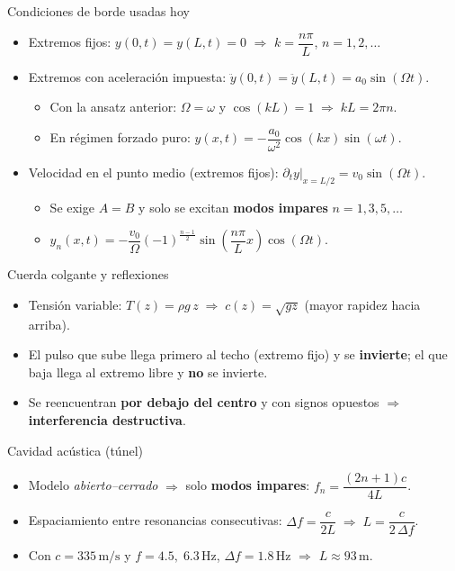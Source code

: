 \documentclass[
    10pt,
    aspectratio=169,
    xcolor={dvipsnames},
    spanish,
    ]{beamer}
\begin{document}
\begin{frame}{Condiciones de borde usadas hoy}
  \footnotesize
  \begin{itemize}
    \item Extremos fijos: $y(0,t)=y(L,t)=0$ $\Rightarrow$ $k=\dfrac{n\pi}{L}$, $n=1,2,\dots$
    \item Extremos con aceleración impuesta: $\ddot y(0,t)=\ddot y(L,t)=a_0\sin(\Omega t)$.
    \begin{itemize}
      \item Con la ansatz anterior: $\Omega=\omega$ y $\cos(kL)=1\;\Rightarrow\;kL=2\pi n$.
      \item En régimen forzado puro: $y(x,t)= -\dfrac{a_0}{\omega^2}\cos(kx)\sin(\omega t)$.
    \end{itemize}
    \item Velocidad en el punto medio (extremos fijos): $\left.\partial_t y\right|_{x=L/2}=v_0\sin(\Omega t)$.
    \begin{itemize}
      \item Se exige $A=B$ y solo se excitan \textbf{modos impares} $n=1,3,5,\dots$
      \item $y_n(x,t)= -\dfrac{v_0}{\Omega}(-1)^{\frac{n-1}{2}}\sin\!\left(\dfrac{n\pi}{L}x\right)\cos(\Omega t)$.
    \end{itemize}
  \end{itemize}
\end{frame}

\begin{frame}{Cuerda colgante y reflexiones}
  \footnotesize
  \begin{itemize}
    \item Tensión variable: $T(z)=\rho g\,z \;\Rightarrow\; c(z)=\sqrt{g z}$ (mayor rapidez hacia arriba).
    \item El pulso que sube llega primero al techo (extremo fijo) y se \textbf{invierte}; el que baja llega al extremo libre y \textbf{no} se invierte.
    \item Se reencuentran \textbf{por debajo del centro} y con signos opuestos $\Rightarrow$ \textbf{interferencia destructiva}.
  \end{itemize}
\end{frame}

\begin{frame}{Cavidad acústica (túnel)}
  \footnotesize
  \begin{itemize}
    \item Modelo \emph{abierto–cerrado} $\Rightarrow$ solo \textbf{modos impares}: $f_n=\dfrac{(2n+1)c}{4L}$.
    \item Espaciamiento entre resonancias consecutivas: $\Delta f=\dfrac{c}{2L}\;\Rightarrow\; L=\dfrac{c}{2\,\Delta f}$.
    \item Con $c=335\,\text{m/s}$ y $f=4.5,\;6.3\,\text{Hz}$, $\Delta f=1.8\,$Hz $\Rightarrow$ $L\approx 93\,$m.
  \end{itemize}
\end{frame}
\end{document}
